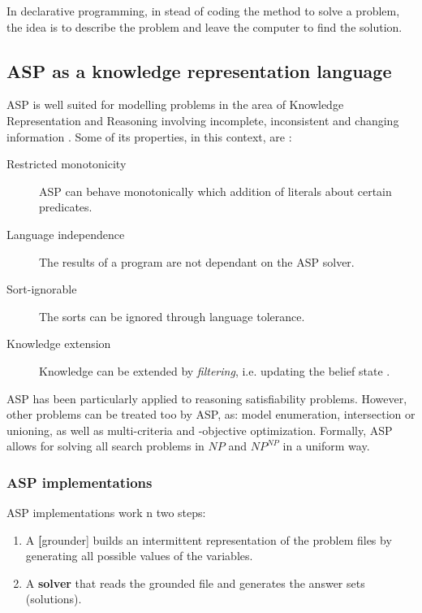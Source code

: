 In declarative programming, in stead of coding the method to solve a problem, the idea is to describe the problem and leave the computer to find the solution.

\subsection{ASP as a knowledge representation language}

ASP is well suited for modelling problems in the area of Knowledge Representation and Reasoning involving incomplete, inconsistent and changing information \citep{Schaub13_ASPBoCo}. Some of its properties, in this context, are \citep{Todorova2006_CKASP}:

\begin{description}
\item[Restricted monotonicity] ASP can behave monotonically which addition of literals about certain predicates.
\item[Language independence] The results of a program are not dependant on the ASP solver.
\item[Sort-ignorable] The sorts can be ignored through language tolerance. %
\item[Knowledge extension] Knowledge can be extended by \textit{filtering}, i.e. updating the belief state \citep{Amir2003_LogFil}.
\end{description}

ASP has been particularly applied to reasoning satisfiability problems.
However, other problems can be treated too by ASP, as: model enumeration, intersection or unioning, as well as multi-criteria and -objective optimization. 
Formally, ASP allows for solving all search problems in $NP$ and $NP^{NP}$ in a uniform way. 


\subsubsection{ASP implementations}
ASP implementations work n two steps:

\begin{enumerate}
\item A \textbf[grounder] builds an intermittent representation of the problem files by generating all possible values of the variables.
\item A \textbf{solver} that reads the grounded file and generates the answer sets (solutions).
\end{enumerate}

